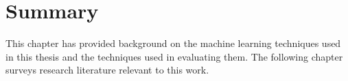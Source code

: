 





\section{Summary}
\label{sec:background-summary}

This chapter has provided background on the machine learning techniques used in this thesis and the techniques used in evaluating them. The following chapter surveys research literature relevant to this work.
